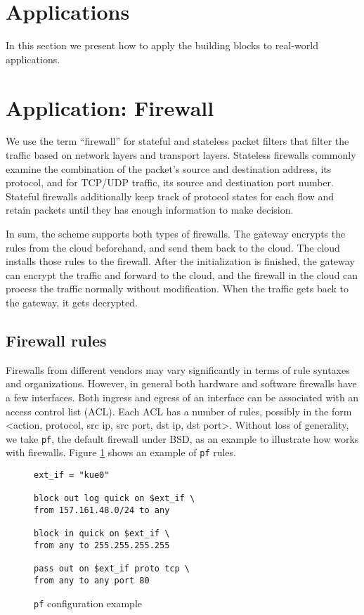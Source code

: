 \section{Applications}


In this section we present how to apply the building blocks to real-world applications.

\section{Application: Firewall}\label{sec:firewall}
We use the term ``firewall'' for stateful and stateless packet filters that filter the traffic based on network layers and transport layers. Stateless firewalls commonly examine the combination of the packet's source and destination address, its protocol, and for TCP/UDP traffic, its source and destination port number. Stateful firewalls additionally keep track of protocol states for each flow and retain packets until they has enough information to make decision. 

In sum, the \RM scheme supports both types of firewalls. The gateway encrypts the rules from the cloud beforehand, and send them back to the cloud. The cloud installs those rules to the firewall. After the initialization is finished, the gateway can encrypt the traffic and forward to the cloud, and the firewall in the cloud can process the traffic normally without modification. When the traffic gets back to the gateway, it gets decrypted.

\subsection{Firewall rules}
Firewalls from different vendors may vary significantly in terms of rule syntaxes and organizations. However,
in general both hardware and software firewalls have a few interfaces. Both ingress and egress of an interface 
can be associated with an access control list (ACL). Each ACL has a number of rules, possibly in the form 
<action, protocol, src ip, src port, dst ip, dst port>. Without loss of generality, we take \texttt{pf}, the 
default firewall under BSD, as an example to illustrate how \sys works with firewalls. Figure \ref{fig:fwrule1} 
shows an example of \texttt{pf} rules. 

\begin{figure}[h]\label{fig:fwrule1}
\begin{lstlisting}[frame=single]
ext_if = "kue0"

block out log quick on $ext_if \
from 157.161.48.0/24 to any

block in quick on $ext_if \
from any to 255.255.255.255

pass out on $ext_if proto tcp \
from any to any port 80
\end{lstlisting}
\caption{\texttt{pf} configuration example}
\end{figure}


